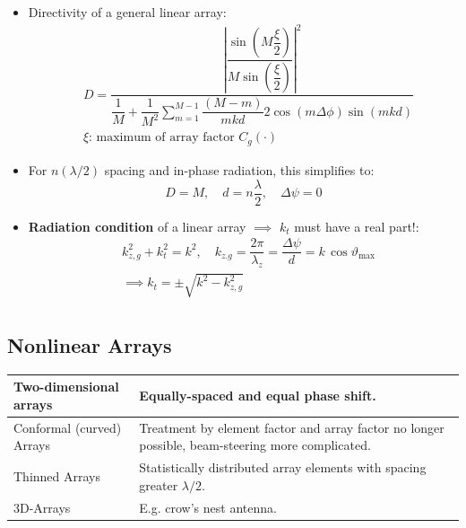 \begin{itemize}
    \item Directivity of a general linear array:
        \begin{align*}
            &D = \dfrac{\left|\dfrac{\sin\left( M\dfrac\xi2 \right)}{M\sin\left( \dfrac\xi2 \right)}\right|^2}{\dfrac{1}{M} + \dfrac{1}{M^2} \sum\limits^{M-1}_{m=1}\dfrac{(M-m)}{mkd} 2\cos\left(m\Delta\phi\right)\sin(mkd)}\\
            &\xi\text{: maximum of array factor } C_g(\cdot)
        \end{align*}
    \item For $n(\lambda/2)$ spacing and in-phase radiation, this simplifies to:
        \begin{equation*}
            D = M, \quad d = n\dfrac{\lambda}{2}, \quad \Delta\psi = 0
        \end{equation*}
    \item \textbf{Radiation condition} of a linear array $\implies$ $k_t$ must have a real part!:\\
        
        \begin{align*}
            &k_{z,g}^2 + k_t^2 = k^2, \quad k_{z.g} = \dfrac{2\pi}{\lambda_z}= \dfrac{\Delta\psi}{d} = k\,\cos\vartheta_{\mathrm{max}}\\
            &\implies k_t = \pm \sqrt{k^2 - k_{z,g}^2}\\
        \end{align*}
\end{itemize}

\subsection{Nonlinear Arrays}
\begin{tabular}{p{2.5cm}p{4.5cm}}
    \toprule
    Two-dimensional arrays & Equally-spaced and equal phase shift.\\\midrule
    Conformal (curved) Arrays & Treatment by element factor and array factor no longer possible, beam-steering more complicated.\\\midrule
    Thinned Arrays & Statistically distributed array elements with spacing greater $\lambda/2$.\\\midrule
    3D-Arrays & E.g. crow's nest antenna.\\
    \bottomrule
\end{tabular}

